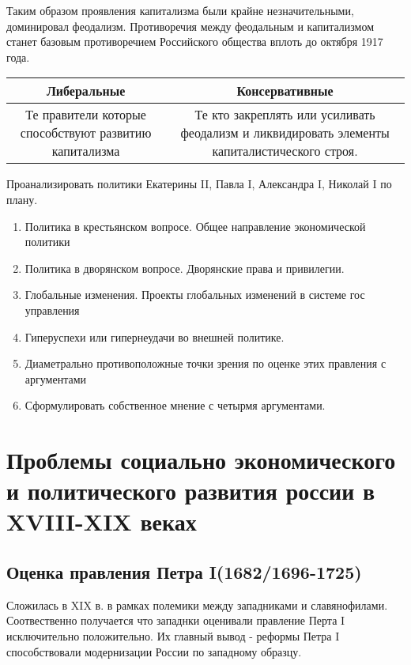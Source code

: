 \documentclass[a4paper]{article}
\begin{document}
Таким образом проявления капитализма были крайне незначительными, доминировал феодализм. Противоречия между феодальным и капитализмом станет базовым противоречием Российского общества вплоть до октября 1917 года.
    
\begin{center}
        \begin{tabulary}{0.7\textwidth}{|c|c|}
        \hline
        Либеральные & Консервативные \\
        \hline
        Те правители которые способствуют развитию капитализма  & Те кто закреплять или усиливать феодализм и ликвидировать элементы капиталистического строя.
        \hline
        \end{tabulary}
\end{center}
Проанализировать политики Екатерины II, Павла I, Александра I, Николай I по плану.

\begin{enumerate}
    \item Политика в крестьянском вопросе. Общее направление экономической политики
    \item Политика в дворянском вопросе. Дворянские права и привилегии.
    \item Глобальные изменения. Проекты глобальных изменений в системе гос управления
    \item Гиперуспехи или гипернеудачи во внешней политике.
    \item Диаметрально противоположные точки зрения по оценке этих правления с аргументами
    \item Сформулировать собственное мнение с четырмя аргументами.
\end{enumerate}

\section{Проблемы социально экономического и политического развития россии в XVIII-XIX веках}

\subsection{Оценка правления Петра I(1682/1696-1725)}

Сложилась в XIX в. в рамках полемики между западниками и славянофилами. Соотвественно получается что западнки оценивали правление Перта I исключительно положительно. Их главный вывод - реформы Петра I способствовали модернизации России по западному образцу.
\end{document}
